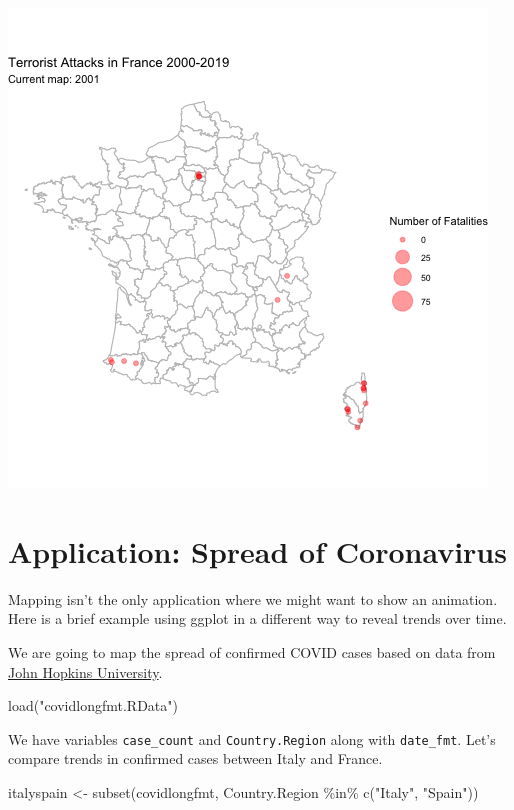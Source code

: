 \documentclass[
  letterpaper,
  DIV=11,
  numbers=noendperiod]{scrreprt}
\newenvironment{Shaded}{\begin{snugshade}}{\end{snugshade}}
\newcommand{\FunctionTok}[1]{\textcolor[rgb]{0.28,0.35,0.67}{#1}}
\newcommand{\NormalTok}[1]{\textcolor[rgb]{0.00,0.23,0.31}{#1}}
\newcommand{\OtherTok}[1]{\textcolor[rgb]{0.00,0.23,0.31}{#1}}
\newcommand{\SpecialCharTok}[1]{\textcolor[rgb]{0.37,0.37,0.37}{#1}}
\newcommand{\StringTok}[1]{\textcolor[rgb]{0.13,0.47,0.30}{#1}}
\begin{document}
\includegraphics{images/gtbplot.gif}

\hypertarget{application-spread-of-coronavirus}{%
\section{Application: Spread of
Coronavirus}\label{application-spread-of-coronavirus}}

Mapping isn't the only application where we might want to show an
animation. Here is a brief example using ggplot in a different way to
reveal trends over time.

We are going to map the spread of confirmed COVID cases based on data
from \href{https://github.com/CSSEGISandData/COVID-19}{John Hopkins
University}.

\begin{Shaded}
\begin{Highlighting}[]
\FunctionTok{load}\NormalTok{(}\StringTok{"covidlongfmt.RData"}\NormalTok{)}
\end{Highlighting}
\end{Shaded}

We have variables \texttt{case\_count} and \texttt{Country.Region} along
with \texttt{date\_fmt}. Let's compare trends in confirmed cases between
Italy and France.

\begin{Shaded}
\begin{Highlighting}[]
\NormalTok{italyspain }\OtherTok{\textless{}{-}} \FunctionTok{subset}\NormalTok{(covidlongfmt, Country.Region }\SpecialCharTok{\%in\%} \FunctionTok{c}\NormalTok{(}\StringTok{"Italy"}\NormalTok{, }\StringTok{"Spain"}\NormalTok{))}
\end{Highlighting}
\end{Shaded}
\end{document}
